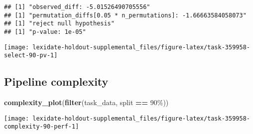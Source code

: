 \documentclass[
]{book}
\newenvironment{Shaded}{\begin{snugshade}}{\end{snugshade}}
\newcommand{\AttributeTok}[1]{\textcolor[rgb]{0.13,0.29,0.53}{#1}}
\newcommand{\DecValTok}[1]{\textcolor[rgb]{0.00,0.00,0.81}{#1}}
\newcommand{\FunctionTok}[1]{\textcolor[rgb]{0.13,0.29,0.53}{\textbf{#1}}}
\newcommand{\NormalTok}[1]{#1}
\newcommand{\OtherTok}[1]{\textcolor[rgb]{0.56,0.35,0.01}{#1}}
\newcommand{\SpecialCharTok}[1]{\textcolor[rgb]{0.81,0.36,0.00}{\textbf{#1}}}
\newcommand{\StringTok}[1]{\textcolor[rgb]{0.31,0.60,0.02}{#1}}
\begin{document}
\begin{Shaded}
\end{Shaded}

\begin{verbatim}
## [1] "observed_diff: -5.01526490705556"
## [1] "permutation_diffs[0.05 * n_permutations]: -1.66663584058073"
## [1] "reject null hypothesis"
## [1] "p-value: 1e-05"
\end{verbatim}

\texttt{[image: lexidate-holdout-supplemental\_files/figure-latex/task-359958-select-90-pv-1]}

\hypertarget{pipeline-complexity-32}{%
\subsection{Pipeline complexity}\label{pipeline-complexity-32}}

\begin{Shaded}
\begin{Highlighting}[]
\FunctionTok{complexity\_plot}\NormalTok{(}\FunctionTok{filter}\NormalTok{(task\_data, split }\SpecialCharTok{==} \StringTok{\textquotesingle{}90\%\textquotesingle{}}\NormalTok{))}
\end{Highlighting}
\end{Shaded}

\texttt{[image: lexidate-holdout-supplemental\_files/figure-latex/task-359958-complexity-90-perf-1]}
\end{document}
